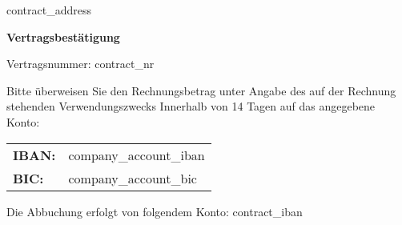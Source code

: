 \documentclass[version=last, fontsize=11pt, fromlogo=true, refline=wide, fromaddress=false, enlargefirstpage=true, numericaldate=true]{scrlttr2}
\begin{document}
	\begin{letter}{{contract\_address}}
		\opening{\textbf{\Large{Vertragsbestätigung}}}

		Vertragsnummer: {contract\_nr}

		\par

		\begin{flushleft}
		\end{flushleft}

		\par
		\begin{flushleft}
		\vspace{0.5cm}

		\ifthenelse{\equal{{contract\_iban}}{}}
		{
			Bitte überweisen Sie den Rechnungsbetrag unter Angabe des auf der Rechnung stehenden Verwendungszwecks Innerhalb von 14 Tagen auf das angegebene Konto:

			\begin{flushleft}
				\begin{small}
					\renewcommand{\arraystretch}{1.1}
					\begin{tabular}{@{}l l}
						\textbf{IBAN:} & {company\_account\_iban}\\
						\textbf{BIC:} & {company\_account\_bic}\\
					\end{tabular}
				\end{small}
			\end{flushleft}
		}
		{
			Die Abbuchung erfolgt von folgendem Konto: {contract\_iban}
		}
		\end{flushleft}
		\par


\end{letter}
\end{document}
